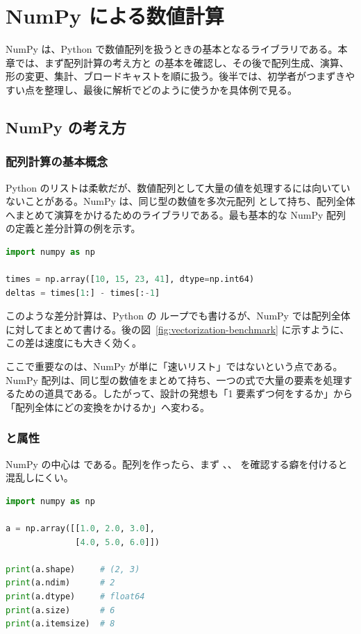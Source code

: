 \chapter{NumPy による数値計算}

NumPy は、Python で数値配列を扱うときの基本となるライブラリである。本章では、まず配列計算の考え方と  の基本を確認し、その後で配列生成、演算、形の変更、集計、ブロードキャストを順に扱う。後半では、初学者がつまずきやすい点を整理し、最後に解析でどのように使うかを具体例で見る。

\section{NumPy の考え方}

\subsection{配列計算の基本概念}

Python のリストは柔軟だが、数値配列として大量の値を処理するには向いていないことがある。NumPy は、同じ型の数値を多次元配列  として持ち、配列全体へまとめて演算をかけるためのライブラリである。最も基本的な NumPy 配列の定義と差分計算の例を示す。

\begin{lstlisting}[language=Python]
import numpy as np

times = np.array([10, 15, 23, 41], dtype=np.int64)
deltas = times[1:] - times[:-1]
\end{lstlisting}

このような差分計算は、Python の  ループでも書けるが、NumPy では配列全体に対してまとめて書ける。後の図~\ref{fig:vectorization-benchmark} に示すように、この差は速度にも大きく効く。

ここで重要なのは、NumPy が単に「速いリスト」ではないという点である。NumPy 配列は、同じ型の数値をまとめて持ち、一つの式で大量の要素を処理するための道具である。したがって、設計の発想も「1 要素ずつ何をするか」から「配列全体にどの変換をかけるか」へ変わる。

\subsection{ と属性}

NumPy の中心は  である。配列を作ったら、まず 、、 を確認する癖を付けると混乱しにくい。

\begin{lstlisting}[language=Python]
import numpy as np

a = np.array([[1.0, 2.0, 3.0],
              [4.0, 5.0, 6.0]])

print(a.shape)     # (2, 3)
print(a.ndim)      # 2
print(a.dtype)     # float64
print(a.size)      # 6
print(a.itemsize)  # 8
\end{lstlisting}

